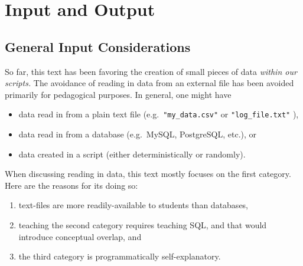 \documentclass[
  12pt,
  krantz2]{krantz}
\providecommand{\tightlist}{%
  \setlength{\itemsep}{0pt}\setlength{\parskip}{0pt}}
\begin{document}
\hypertarget{input-and-output}{%
\chapter{Input and Output}\label{input-and-output}}

\hypertarget{general-input-considerations}{%
\section{General Input Considerations}\label{general-input-considerations}}

So far, this text has been favoring the creation of small pieces of data \emph{within our scripts.} The avoidance of reading in data from an external file has been avoided primarily for pedagogical purposes. In general, one might have

\begin{itemize}
\tightlist
\item
  data read in from a plain text file (e.g.~\texttt{"my\_data.csv"} or \texttt{"log\_file.txt"} ),
\item
  data read in from a database (e.g.~MySQL, PostgreSQL, etc.), or
\item
  data created in a script (either deterministically or randomly).
\end{itemize}

When discussing reading in data, this text mostly focuses on the first category. Here are the reasons for its doing so:

\begin{enumerate}
\def\labelenumi{\arabic{enumi}.}
\tightlist
\item
  text-files are more readily-available to students than databases,
\item
  teaching the second category requires teaching SQL, and that would introduce conceptual overlap, and
\item
  the third category is programmatically self-explanatory.
\end{enumerate}
\end{document}
